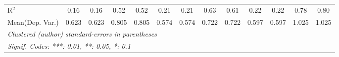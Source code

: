 \begin{tabular}{lcccccccccccc}
   R$^2$                                    & 0.16          & 0.16           & 0.52         & 0.52    & 0.21          & 0.21          & 0.63         & 0.61    & 0.22          & 0.22          & 0.78    & 0.80\\  
Mean(Dep. Var.) & 0.623 & 0.623 & 0.805 & 0.805 & 0.574 & 0.574 & 0.722 & 0.722 & 0.597 & 0.597 & 1.025 & 1.025 \\
   \midrule \midrule
   \multicolumn{13}{l}{\emph{Clustered (author) standard-errors in parentheses}}\\
   \multicolumn{13}{l}{\emph{Signif. Codes: ***: 0.01, **: 0.05, *: 0.1}}\\
\end{tabular}
\par\endgroup
